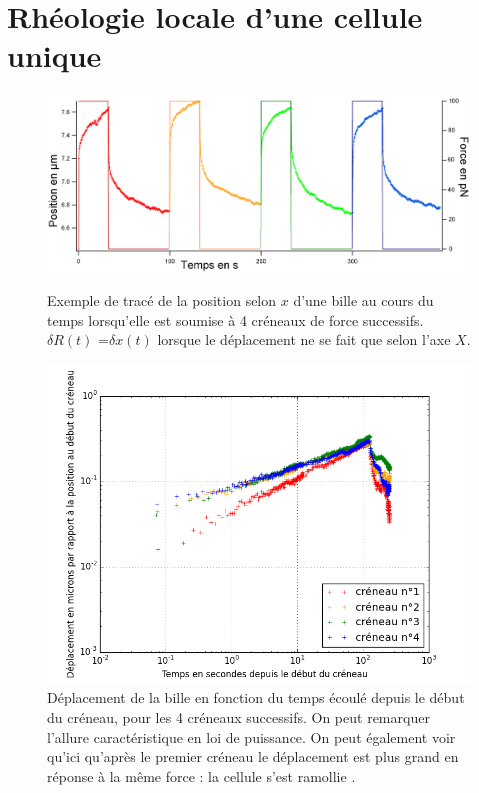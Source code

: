 \documentclass                                                                                                                                                                                                                                                                                                                                       {report}
\begin{document}
\chapter{Rhéologie locale d'une cellule unique}
\begin{figure}[p]
\includegraphics[scale=0.09]{c9-rigidification-couleurs.png}

\caption{Exemple de tracé de la position selon $x$ d'une bille au cours du temps lorsqu'elle est soumise à 4 créneaux de force successifs. $\delta R(t)$ =$\delta x(t)$ lorsque le déplacement ne se fait que selon l'axe $X$.\label{Exemple}} 
	\includegraphics[scale=0.5]{Figures/Exemple_C162_loglog.png}
	\caption{Déplacement de la bille en fonction du temps écoulé depuis le début du créneau, pour les 4 créneaux successifs. On peut remarquer l'allure caractéristique en loi de puissance. On peut également voir qu'ici qu'après le premier créneau le déplacement est plus grand en réponse à la même force : la cellule s'est \og ramollie \fg. }
\end{figure}
\end{document}
